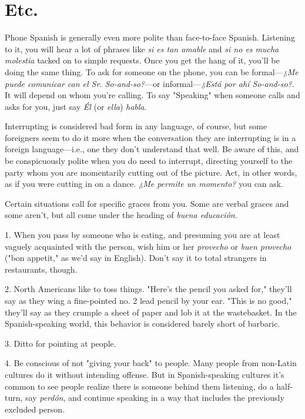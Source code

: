 \documentclass[14pt,a4paper,oneside]{memoir}
\newcommand{\bsk}{\vspace{20pt}}
\begin{document}
\section{Etc.}

Phone Spanish is generally even more polite than face-to-face
Spanish. Listening to it, you will hear a lot of phrases like \emph{si es tan
amable} and \emph{si no es mucha molestia} tacked on to simple requests.
Once you get the hang of it, you'll be doing the same thing. To ask for
someone on the phone, you can be formal---\emph{¿Me puede comunicar can
el Sr. So-and-so?}---or informal---\emph{¿Está por ahí So-and-so?}. It will depend on whom you're calling. To say "Speaking" when someone calls
and asks for you, just say \emph{Él} (or \emph{ella}) \emph{habla}.

Interrupting is considered bad form in any language, of course,
but some foreigners seem to do it more when the conversation they are
interrupting is in a foreign language---i.e., one they don't understand
that well. Be aware of this, and be conspicuously polite when you do
need to interrupt, directing yourself to the party whom you are momentarily cutting out of the picture. Act, in other words, as if you were
cutting in on a dance. \emph{¿Me permite un momento?} you can ask.

Certain situations call for specific graces from you. Some are
verbal graces and some aren't, but all come under the heading of \emph{buena educación}.

\bsk

1. When you pass by someone who is eating, and presuming
you are at least vaguely acquainted with the person, wish him or her
\emph{provecho} or \emph{buen provecho} ("bon appetit," as we'd say in English).
Don't say it to total strangers in restaurants, though.

2. North Americans like to toss things. "Here's the pencil you
asked for," they'll say as they wing a fine-pointed no. 2 lead pencil by
your ear. "This is no good," they'll say as they crumple a sheet of paper
and lob it at the wastebasket. In the Spanish-speaking world, this behavior is considered barely short of barbaric.

3. Ditto for pointing at people.

4. Be conscious of not "giving your back" to people. Many
people from non-Latin cultures do it without intending offense. But in
Spanish-speaking cultures it's common to see people realize there is
someone behind them listening, do a half-turn, say \emph{perdón}, and continue speaking in a way that includes the previously excluded person.
\end{document}
